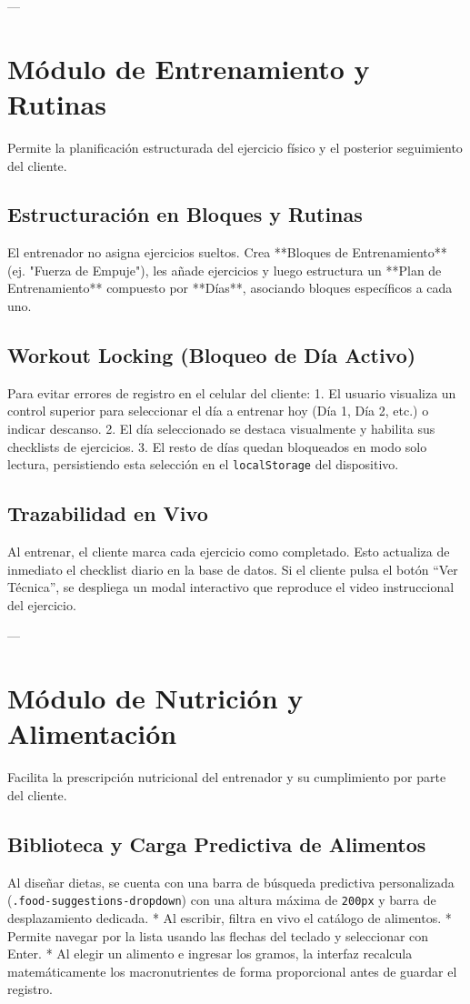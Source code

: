 \documentclass[11pt]{article}
\begin{document}
---

\section{Módulo de Entrenamiento y Rutinas}
Permite la planificación estructurada del ejercicio físico y el posterior seguimiento del cliente.

\subsection{Estructuración en Bloques y Rutinas}
El entrenador no asigna ejercicios sueltos. Crea **Bloques de Entrenamiento** (ej. "Fuerza de Empuje"), les añade ejercicios y luego estructura un **Plan de Entrenamiento** compuesto por **Días**, asociando bloques específicos a cada uno.

\subsection{Workout Locking (Bloqueo de Día Activo)}
Para evitar errores de registro en el celular del cliente:
1. El usuario visualiza un control superior para seleccionar el día a entrenar hoy (Día 1, Día 2, etc.) o indicar descanso.
2. El día seleccionado se destaca visualmente y habilita sus checklists de ejercicios.
3. El resto de días quedan bloqueados en modo solo lectura, persistiendo esta selección en el \texttt{localStorage} del dispositivo.

\subsection{Trazabilidad en Vivo}
Al entrenar, el cliente marca cada ejercicio como completado. Esto actualiza de inmediato el checklist diario en la base de datos. Si el cliente pulsa el botón ``Ver Técnica'', se despliega un modal interactivo que reproduce el video instruccional del ejercicio.

---

\section{Módulo de Nutrición y Alimentación}
Facilita la prescripción nutricional del entrenador y su cumplimiento por parte del cliente.

\subsection{Biblioteca y Carga Predictiva de Alimentos}
Al diseñar dietas, se cuenta con una barra de búsqueda predictiva personalizada (\texttt{.food-suggestions-dropdown}) con una altura máxima de \texttt{200px} y barra de desplazamiento dedicada.
* Al escribir, filtra en vivo el catálogo de alimentos.
* Permite navegar por la lista usando las flechas del teclado y seleccionar con Enter.
* Al elegir un alimento e ingresar los gramos, la interfaz recalcula matemáticamente los macronutrientes de forma proporcional antes de guardar el registro.
\end{document}
